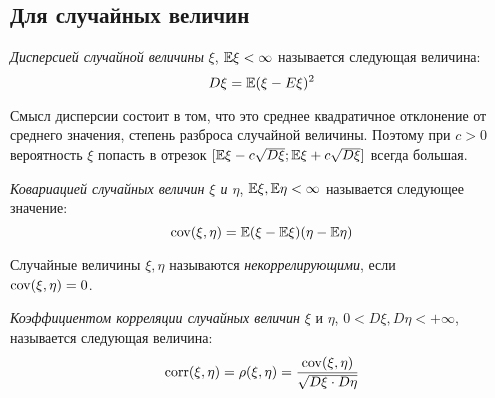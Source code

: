 \subsection{Для случайных величин}

\begin{definition}
	\textit{Дисперсией случайной величины} $\xi$, $\mathbb{E}\xi < \infty$ называется следующая величина:
	\[
		D\xi = \mathbb{E}(\xi - E\xi)^2
	\]
\end{definition}

\begin{note}
	Смысл дисперсии состоит в том, что это среднее квадратичное отклонение от среднего значения, степень разброса случайной величины. Поэтому при $c > 0$ вероятность $\xi$ попасть в отрезок $[\mathbb{E}\xi - c\sqrt{D\xi}; \mathbb{E}\xi + c\sqrt{D\xi}]$ всегда большая.
\end{note}

\begin{definition}
	\textit{Ковариацией случайных величин $\xi$ и $\eta$}, $\mathbb{E}\xi, \mathbb{E}\eta < \infty$ называется следующее значение:
	\[
		\operatorname{cov}(\xi, \eta) = \mathbb{E}(\xi - \mathbb{E}\xi)(\eta - \mathbb{E}\eta)
	\]
\end{definition}

\begin{definition}
	Случайные величины $\xi, \eta$ называются \textit{некоррелирующими}, если \\ $\operatorname{cov}(\xi, \eta) = 0$.
\end{definition}

\begin{definition}
	\textit{Коэффициентом корреляции случайных величин} $\xi$ и $\eta$, $0 < D\xi, D\eta < +\infty$, называется следующая величина:
	\[
		\operatorname{corr}(\xi, \eta) = \rho(\xi, \eta) = \frac{\operatorname{cov}(\xi, \eta)}{\sqrt{D\xi \cdot D\eta}}
	\]
\end{definition}